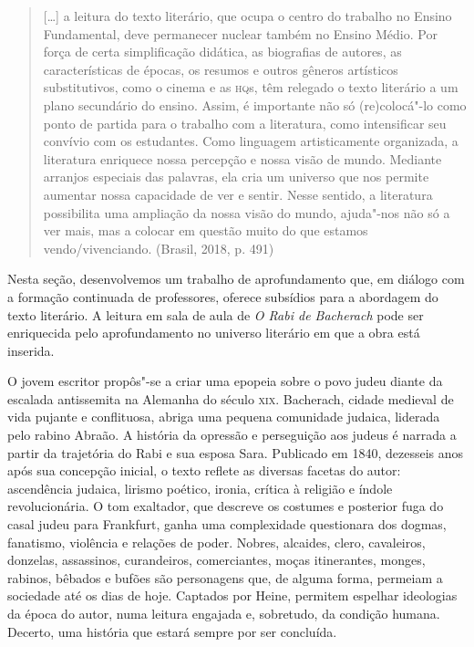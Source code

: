 \documentclass[12pt]{extarticle}
\begin{document}
\begin{quote}
{[}\ldots{}{]} a leitura do texto literário, que ocupa o centro do trabalho
no Ensino Fundamental, deve permanecer nuclear também no Ensino Médio.
Por força de certa simplificação didática, as biografias de autores, as
características de épocas, os resumos e outros gêneros artísticos
substitutivos, como o cinema e as \textsc{hq}s, têm relegado o texto literário a
um plano secundário do ensino. Assim, é importante não só (re)colocá"-lo
como ponto de partida para o trabalho com a literatura, como
intensificar seu convívio com os estudantes. Como linguagem
artisticamente organizada, a literatura enriquece nossa percepção e
nossa visão de mundo. Mediante arranjos especiais das palavras, ela cria
um universo que nos permite aumentar nossa capacidade de ver e sentir.
Nesse sentido, a literatura possibilita uma ampliação da nossa visão do
mundo, ajuda"-nos não só a ver mais, mas a colocar em questão muito do
que estamos vendo/vivenciando. (Brasil, 2018, p. 491)
\end{quote}

Nesta seção, desenvolvemos um trabalho de aprofundamento que, em diálogo
com a formação continuada de professores, oferece subsídios para a
abordagem do texto literário. A leitura em sala de aula de \emph{O Rabi
de Bacherach} pode ser enriquecida pelo aprofundamento no universo
literário em que a obra está inserida.


O jovem escritor propôs"-se a criar uma epopeia sobre o
povo judeu diante da escalada antissemita na Alemanha do século \textsc{xix}.
Bacherach, cidade medieval de vida pujante e conflituosa, abriga uma
pequena comunidade judaica, liderada pelo rabino Abraão. A história da
opressão e perseguição aos judeus é narrada a partir da trajetória do
Rabi e sua esposa Sara. Publicado em 1840, dezesseis anos após sua
concepção inicial, o texto reflete as diversas facetas do autor:
ascendência judaica, lirismo poético, ironia, crítica à religião e
índole revolucionária. O tom exaltador, que descreve os costumes e
posterior fuga do casal judeu para Frankfurt, ganha uma complexidade
questionara dos dogmas, fanatismo, violência e relações de poder.
Nobres, alcaides, clero, cavaleiros, donzelas, assassinos, curandeiros,
comerciantes, moças itinerantes, monges, rabinos, bêbados e bufões são
personagens que, de alguma forma, permeiam a sociedade até os dias de
hoje. Captados por Heine, permitem espelhar ideologias da época do
autor, numa leitura engajada e, sobretudo, da condição humana. Decerto,
uma história que estará sempre por ser concluída.
\end{document}
